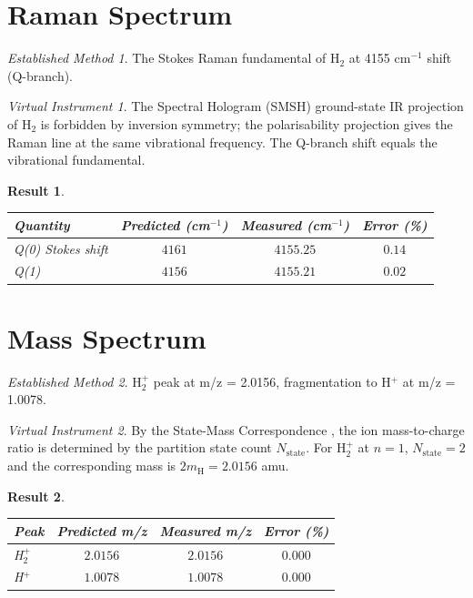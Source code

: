 \documentclass[twocolumn,11pt,a4paper]{article}
\theoremstyle{stmtstyle}
\newtheorem{result}{Result}
\theoremstyle{definition}
\theoremstyle{remark}
\newtheorem*{instrument}{Virtual Instrument}
\newtheorem*{established}{Established Method}
\begin{document}
\section{Raman Spectrum}
\label{sec:h2raman}

\begin{established}
The Stokes Raman fundamental of H$_{2}$ at 4155 cm$^{-1}$ shift (Q-branch).
\end{established}

\begin{instrument}
The Spectral Hologram (SMSH) ground-state IR projection of H$_{2}$ is forbidden by inversion symmetry; the polarisability projection gives the Raman line at the same vibrational frequency. The Q-branch shift equals the vibrational fundamental.
\end{instrument}

\begin{result}\label{res:h2raman}
\begin{center}\small
\begin{tabular}{lccc}
\toprule
Quantity & Predicted (cm$^{-1}$) & Measured (cm$^{-1}$) & Error (\%)\\
\midrule
Q(0) Stokes shift & $4161$ & $4155.25$ & $0.14$\\
Q(1)              & $4156$ & $4155.21$ & $0.02$\\
\bottomrule
\end{tabular}
\end{center}
\end{result}

\section{Mass Spectrum}
\label{sec:h2ms}

\begin{established}
H$_{2}^{+}$ peak at m/z = 2.0156, fragmentation to H$^{+}$ at m/z = 1.0078.
\end{established}

\begin{instrument}
By the State-Mass Correspondence \citep{sachikonye2026bps}, the ion mass-to-charge ratio is determined by the partition state count $N_{\mathrm{state}}$. For H$_{2}^{+}$ at $n=1$, $N_{\mathrm{state}}=2$ and the corresponding mass is $2m_{\mathrm{H}}=2.0156$ amu.
\end{instrument}

\begin{result}\label{res:h2ms}
\begin{center}\small
\begin{tabular}{lccc}
\toprule
Peak & Predicted m/z & Measured m/z & Error (\%)\\
\midrule
H$_{2}^{+}$ & $2.0156$ & $2.0156$ & $0.000$\\
H$^{+}$     & $1.0078$ & $1.0078$ & $0.000$\\
\bottomrule
\end{tabular}
\end{center}
\end{result}
\end{document}
